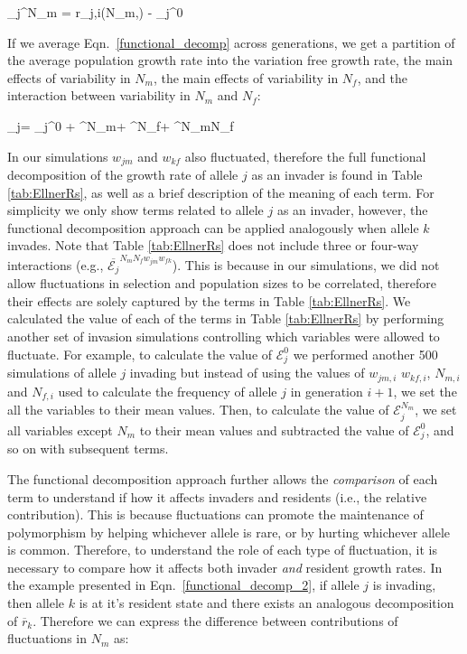 \documentclass[12pt]{article}
\let\oldequation\equation
\let\oldendequation\endequation
\renewenvironment{equation}
  {\linenomathNonumbers\oldequation}
  {\oldendequation\endlinenomath}
\begin{document}
\begin{equation}
  _{j}^{N_{m}} = r_{j,i}(N_{m},) - _{j}^{0}
\end{equation}

If we average Eqn.~\ref{functional_decomp} across generations, we get a partition of the average population growth rate into the variation free growth rate, the main effects of variability in $N_{m}$, the main effects of variability in $N_{f}$, and the interaction between variability in $N_{m}$ and $N_{f}$:

\begin{equation}
    _{j}= _{j}^{0} + ^{N_{m}}+ ^{N_{f}}+ ^{N_{m}N_{f}}
   \label{functional_decomp_2}
\end{equation}

In our simulations $w_{jm}$ and $w_{kf}$ also fluctuated, therefore the full functional decomposition of the growth rate of allele $j$ as an invader is found in Table \ref{tab:EllnerRs}, as well as a brief description of the meaning of each term. For simplicity we only show terms related to allele $j$ as an invader, however, the functional decomposition approach can be applied analogously when allele $k$ invades. Note that Table \ref{tab:EllnerRs} does not include three or four-way interactions (e.g., $\overline{\mathcal{E}_{j}}^{N_{m}N_{f}w_{jm}w_{fk}}$). This is because in our simulations, we did not allow fluctuations in selection and population sizes to be correlated, therefore their effects are solely captured by the terms in Table \ref{tab:EllnerRs}. We calculated the value of each of the terms in Table \ref{tab:EllnerRs} by performing another set of invasion simulations controlling which variables were allowed to fluctuate. For example, to calculate the value of $\mathcal{E}_{j}^{0}$ we performed another 500 simulations of allele $j$ invading but instead of using the values of $w_{jm,i}$ $w_{kf,i}$, $N_{m,i}$ and $N_{f,i}$ used to calculate the frequency of allele $j$ in generation $i+1$, we set the all the variables to their mean values. Then, to calculate the value of $\mathcal{E}_{j}^{N_{m}}$, we set all variables except  $N_{m}$ to their mean values and subtracted the value of $\mathcal{E}_{j}^{0}$, and so on with subsequent terms.

The functional decomposition approach further allows the \textit{comparison} of each term to understand if how it affects invaders and residents (i.e., the relative contribution). This is because fluctuations can promote the maintenance of polymorphism by helping whichever allele is rare, or by hurting whichever allele is common. Therefore, to understand the role of each type of fluctuation, it is necessary to compare how it affects both invader \textit{and} resident growth rates. In the example presented in Eqn.~\ref{functional_decomp_2}, if allele $j$ is invading, then allele $k$ is at it's resident state and there exists an analogous decomposition of $\overline{r}_{k}$. Therefore we can express the difference between contributions of fluctuations in $N_{m}$ as:
\end{document}
